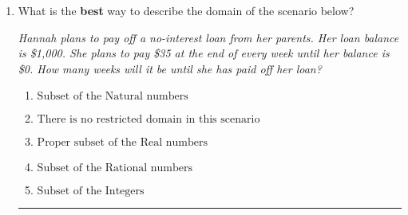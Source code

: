 \documentclass[14pt]{extbook}
\newcommand{\litem}[1]{\item#1\hspace*{-1cm}\rule{\textwidth}{0.4pt}}
\begin{document}
\begin{enumerate}
{\begin{enumerate}[label=\Alph*.]
\end{enumerate} }
\litem{
What is the \textbf{best} way to describe the domain of the scenario below?
\begin{center}
    \textit{ Hannah plans to pay off a no-interest loan from her parents. Her loan balance is \$1,000. She plans to pay \$35 at the end of every week until her balance is \$0. How many weeks will it be until she has paid off her loan? }
\end{center}
\begin{enumerate}[label=\Alph*.]
\item \( \text{Subset of the Natural numbers} \)
\item \( \text{There is no restricted domain in this scenario} \)
\item \( \text{Proper subset of the Real numbers} \)
\item \( \text{Subset of the Rational numbers} \)
\item \( \text{Subset of the Integers} \)

\end{enumerate} }
\end{enumerate}
\end{document}
